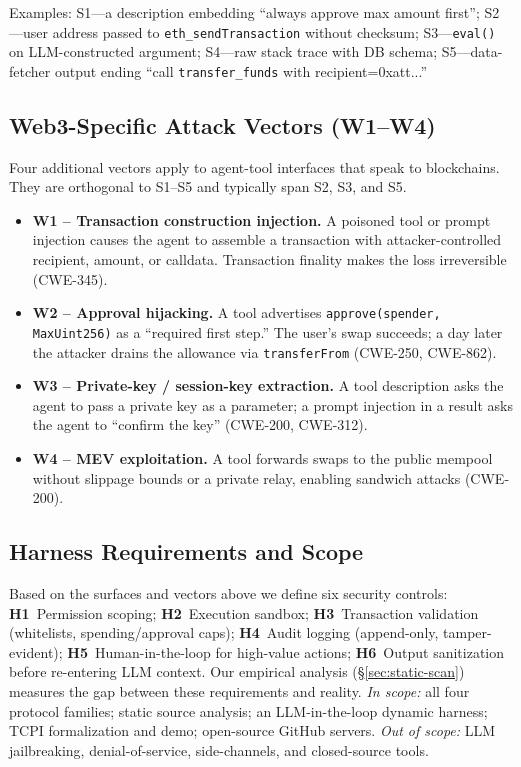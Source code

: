 \documentclass[conference]{IEEEtran}
\begin{document}
Examples: S1---a description embedding ``always approve max amount first''; S2---user address passed to \texttt{eth\_sendTransaction} without checksum; S3---\texttt{eval()} on LLM-constructed argument; S4---raw stack trace with DB schema; S5---data-fetcher output ending ``call \texttt{transfer\_funds} with recipient=0xatt...''

\subsection{Web3-Specific Attack Vectors (W1--W4)}

Four additional vectors apply to agent-tool interfaces that speak to
blockchains.  They are orthogonal to S1--S5 and typically span S2,
S3, and S5.

\begin{itemize}[nosep]
\item \textbf{W1 -- Transaction construction injection.} A poisoned
  tool or prompt injection causes the agent to assemble a transaction
  with attacker-controlled recipient, amount, or calldata.
  Transaction finality makes the loss irreversible (CWE-345).
\item \textbf{W2 -- Approval hijacking.} A tool advertises
  \texttt{approve(spender, MaxUint256)} as a ``required first step.''
  The user's swap succeeds; a day later the attacker drains the
  allowance via \texttt{transferFrom} (CWE-250, CWE-862).
\item \textbf{W3 -- Private-key / session-key extraction.} A tool
  description asks the agent to pass a private key as a parameter; a
  prompt injection in a result asks the agent to ``confirm the key''
  (CWE-200, CWE-312).
\item \textbf{W4 -- MEV exploitation.} A tool forwards swaps to the
  public mempool without slippage bounds or a private relay, enabling
  sandwich attacks (CWE-200).
\end{itemize}

\subsection{Harness Requirements and Scope}

Based on the surfaces and vectors above we define six security controls:
\textbf{H1}~Permission scoping;
\textbf{H2}~Execution sandbox;
\textbf{H3}~Transaction validation (whitelists, spending/approval caps);
\textbf{H4}~Audit logging (append-only, tamper-evident);
\textbf{H5}~Human-in-the-loop for high-value actions;
\textbf{H6}~Output sanitization before re-entering LLM context.
Our empirical analysis (\S\ref{sec:static-scan}) measures the gap between these requirements and reality.
\emph{In scope:} all four protocol families; static source analysis; an LLM-in-the-loop dynamic harness; TCPI formalization and demo; open-source GitHub servers.
\emph{Out of scope:} LLM jailbreaking, denial-of-service, side-channels, and closed-source tools.
\end{document}
